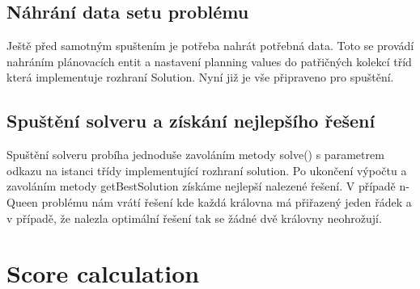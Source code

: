 \subsection{Náhrání data setu problému}
Ještě před samotným spuštením je potřeba nahrát potřebná data. Toto se provádí nahráním plánovacích entit a nastavení planning values do patřičných kolekcí tříd která implementuje rozhraní Solution. Nyní již je vše připraveno pro spuštění.

\subsection{Spuštění solveru a získání nejlepšího řešení}
Spuštění solveru probíha jednoduše zavoláním metody solve() s parametrem odkazu na istanci třídy implementující rozhraní solution. Po ukončení výpočtu a zavoláním metody getBestSolution získáme nejlepší nalezené řešení. V případě n-Queen problému nám vrátí řešení kde každá královna má přiřazený jeden řádek a v případě, že nalezla optimální řešení tak se žádné dvě královny neohrožují.

\section{Score calculation}
